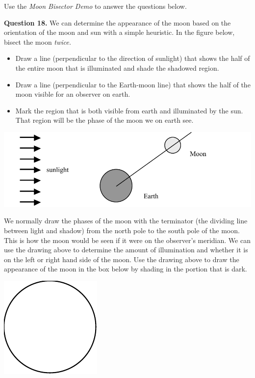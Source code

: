 \documentclass[11pt]{article}
\begin{document}
Use the \emph{Moon Bisector Demo} to answer the questions below.

\noindent
\textbf{Question 18.} 
We can determine the appearance of the moon based on the orientation of the moon and sun with a simple heuristic.   In the figure below, bisect the moon \emph{twice.} 
\begin{itemize}
\item Draw a line (perpendicular to the direction of sunlight) that shows the half of the entire moon that is illuminated and shade the shadowed region.
\item Draw a line (perpendicular to the Earth-moon line) that shows the half of the moon visible for an observer on earth. 
\item Mark the region that is both visible from earth and illuminated by the sun. That region will be the phase of the moon we on earth see.
\end{itemize}

\newpage

\vspace*{1cm}
\begin{center}
\includegraphics{moon_bisect}
\end{center}
\vspace*{1cm}

\noindent
We normally draw the phases of the moon with the terminator (the dividing line between light and shadow) from the north pole to the south pole of the moon.  This is how the moon would be seen if it were on the observer's meridian.  We can use the drawing above to determine the amount of illumination and whether it is on the left or right hand side of the moon.  Use the drawing above to draw the appearance of the moon in the box below by shading in the portion that is dark.

\begin{center}
\includegraphics{blank_moon}
\end{center}
\end{document}
